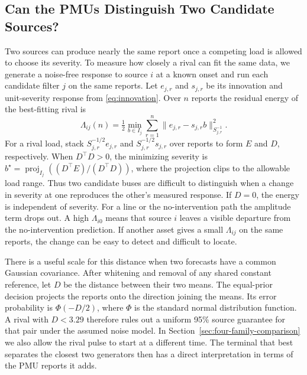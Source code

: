 \subsection{Can the PMUs Distinguish Two Candidate Sources?}
\label{sec:theory}

Two sources can produce nearly the same report once a competing load is
allowed to choose its severity. To measure how closely a rival can fit the same data, we generate a
noise-free response to source $i$ at a known onset and run each candidate
filter $j$ on the same reports. Let $e_{j,r}$ and $s_{j,r}$ be its
innovation and unit-severity response from \eqref{eq:innovation}.
Over $n$ reports the residual energy of the best-fitting rival is
\begin{equation}
 \Lambda_{ij}(n)=\tfrac12\min_{b\in I_j}\sum_{r=1}^{n}
       \|e_{j,r}-s_{j,r}b\|_{S_{j,r}^{-1}}^2 .
 \label{eq:signature-information}
\end{equation}
For a rival load, stack $S_{j,r}^{-1/2}e_{j,r}$ and
$S_{j,r}^{-1/2}s_{j,r}$ over reports to form $E$ and $D$,
respectively. When $D^\top D>0$, the minimizing severity is
$b^\star=\operatorname{proj}_{I_j}((D^\top E)/(D^\top D))$, where the
projection clips to the allowable load range. Thus two candidate buses
are difficult to distinguish when a change in severity at one reproduces
the other's measured response. If $D=0$, the energy is independent of
severity.
For a line or the no-intervention path the amplitude term drops out.
A high $\Lambda_{i0}$ means that source $i$ leaves a visible departure
from the no-intervention prediction. If another asset gives a small
$\Lambda_{ij}$ on the same reports, the change can be easy to detect
and difficult to locate.

There is a useful scale for this distance when two forecasts have a
common Gaussian covariance. After whitening and removal of any shared
constant reference, let $D$ be the distance between their two means.
The equal-prior decision projects the reports onto the direction
joining the means. Its error probability is $\Phi(-D/2)$, where
$\Phi$ is the standard normal distribution function. A rival with
$D<3.29$ therefore rules out a uniform 95\% source guarantee for that
pair under the assumed noise model. In Section~\ref{sec:four-family-comparison}
we also allow the rival pulse to start at a different time. The
terminal that best separates the closest two generators then has a
direct interpretation in terms of the PMU reports it adds.

